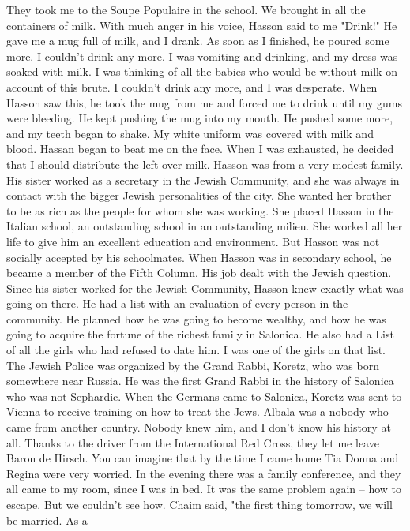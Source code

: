 They took me to the Soupe Populaire in the school. We brought in 
all the containers of milk. With much anger in his voice, Hasson 
said to me "Drink!" He gave me a mug full of milk, and I drank. As 
soon as I finished, he poured some more. I couldn't drink any more. I 
was vomiting and drinking, and my dress was soaked with milk. I was 
thinking of all the babies who would be without milk on account of this 
brute. I couldn't drink any more, and I was desperate. When Hasson saw 
this, he took the mug from me and forced me to drink until my gums were 
bleeding. He kept pushing the mug into my mouth. He pushed some more, 
and my teeth began to shake. My white uniform was covered with milk and 
blood. Hassan began to beat me on the face. When I was exhausted, he 
decided that I should distribute the left over milk. 
Hasson was from a very modest family. His sister worked as a secretary in the Jewish Community, and she was always in contact with the 
bigger Jewish personalities of the city. She wanted her brother to be 
as rich as the people for whom she was working. She placed Hasson in 
the Italian school, an outstanding school in an outstanding milieu. She 
worked all her life to give him an excellent education and environment. 
But Hasson was not socially accepted by his schoolmates. 
When Hasson was in secondary school, he became a member of the Fifth 
Column. His job dealt with the Jewish question. Since his sister 
worked for the Jewish Community, Hasson knew exactly what was going on 
there. He had a list with an evaluation of every person in the community. He planned how he was going to become wealthy, and how he was going to acquire the fortune of the richest family in Salonica. He also had a List of all the girls who had refused to date him. I was one of 
the girls on that list. 
The Jewish Police was organized by the Grand Rabbi, Koretz, who was 
born somewhere near Russia. He was the first Grand Rabbi in the history 
of Salonica who was not Sephardic. When the Germans came to Salonica, 
Koretz was sent to Vienna to receive training on how to treat the Jews. 
Albala was a nobody who came from another country. Nobody knew him, 
and I don't know his history at all. 
Thanks to the driver from the International Red Cross, they let 
me leave Baron de Hirsch. You can imagine that by the time I came  
home Tia Donna and Regina were very worried. In the evening there was 
a family conference, and they all came to my room, since I was in bed. 
It was the same problem again -- how to escape. But we couldn't see 
how. Chaim said, "the first thing tomorrow, we will be married. As a 
